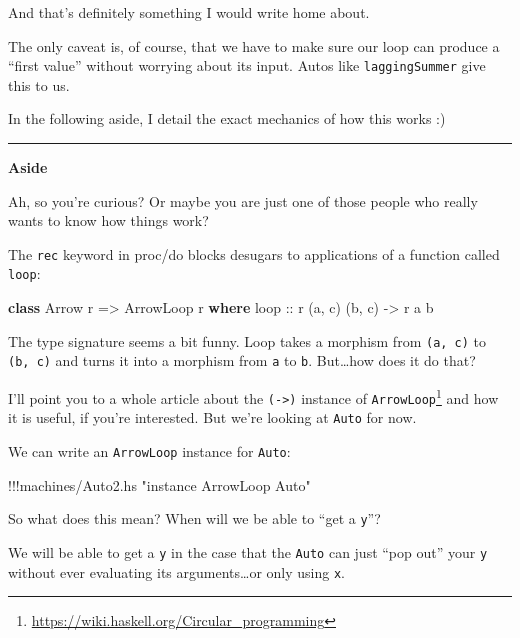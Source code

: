 \documentclass[]{article}
\newenvironment{Shaded}{}{}
\newcommand{\KeywordTok}[1]{\textcolor[rgb]{0.00,0.44,0.13}{\textbf{{#1}}}}
\newcommand{\DataTypeTok}[1]{\textcolor[rgb]{0.56,0.13,0.00}{{#1}}}
\newcommand{\StringTok}[1]{\textcolor[rgb]{0.25,0.44,0.63}{{#1}}}
\newcommand{\OtherTok}[1]{\textcolor[rgb]{0.00,0.44,0.13}{{#1}}}
\newcommand{\FunctionTok}[1]{\textcolor[rgb]{0.02,0.16,0.49}{{#1}}}
\newcommand{\NormalTok}[1]{{#1}}
\renewcommand{\href}[2]{#2\footnote{\url{#1}}}
\begin{document}
And that's definitely something I would write home about.

The only caveat is, of course, that we have to make sure our loop can
produce a ``first value'' without worrying about its input. Autos like
\texttt{laggingSummer} give this to us.

In the following aside, I detail the exact mechanics of how this works
:)

\begin{center}\rule{0.5\linewidth}{\linethickness}\end{center}

\textbf{Aside}

Ah, so you're curious? Or maybe you are just one of those people who
really wants to know how things work?

The \texttt{rec} keyword in proc/do blocks desugars to applications of a
function called \texttt{loop}:

\begin{Shaded}
\begin{Highlighting}[]
\KeywordTok{class} \DataTypeTok{Arrow} \NormalTok{r }\OtherTok{=>} \DataTypeTok{ArrowLoop} \NormalTok{r }\KeywordTok{where}
\OtherTok{    loop ::} \NormalTok{r (a, c) (b, c) }\OtherTok{->} \NormalTok{r a b}
\end{Highlighting}
\end{Shaded}

The type signature seems a bit funny. Loop takes a morphism from
\texttt{(a,\ c)} to \texttt{(b,\ c)} and turns it into a morphism from
\texttt{a} to \texttt{b}. But\ldots{}how does it do that?

I'll point you to \href{https://wiki.haskell.org/Circular_programming}{a
whole article about the \texttt{(-\textgreater{})} instance of
\texttt{ArrowLoop}} and how it is useful, if you're interested. But
we're looking at \texttt{Auto} for now.

We can write an \texttt{ArrowLoop} instance for \texttt{Auto}:

\begin{Shaded}
\begin{Highlighting}[]
\FunctionTok{!!!}\NormalTok{machines}\FunctionTok{/}\NormalTok{Auto2.hs }\StringTok{"instance ArrowLoop Auto"}
\end{Highlighting}
\end{Shaded}

So what does this mean? When will we be able to ``get a \texttt{y}''?

We will be able to get a \texttt{y} in the case that the \texttt{Auto}
can just ``pop out'' your \texttt{y} without ever evaluating its
arguments\ldots{}or only using \texttt{x}.
\end{document}
